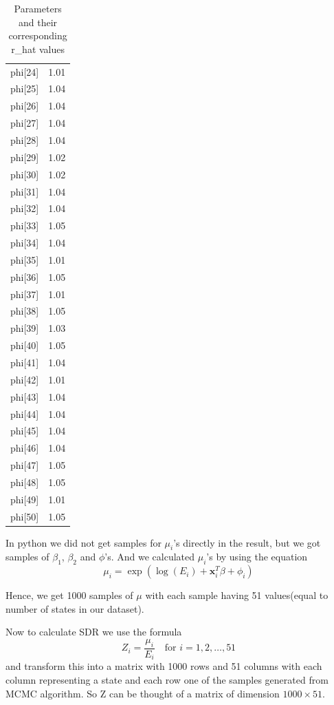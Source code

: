 \documentclass[enabledeprecatedfontcommands,parskip=half,twoside=semi,BCOR=0mm]{scrreprt}
\numberwithin{equation}{chapter}
\theoremstyle{definition}
\theoremstyle{remark}
\begin{document}
\begin{table}[h!]
\begin{adjustbox}{max width=\textwidth}
\begin{minipage}{0.48\textwidth}
\begin{tabular}{l r}
    phi[24] & 1.01 \\
    phi[25] & 1.04 \\
    phi[26] & 1.04 \\
    phi[27] & 1.04 \\
    phi[28] & 1.04 \\
    phi[29] & 1.02 \\
    phi[30] & 1.02 \\
    phi[31] & 1.04 \\
    phi[32] & 1.04 \\
    phi[33] & 1.05 \\
    phi[34] & 1.04 \\
    phi[35] & 1.01 \\
    phi[36] & 1.05 \\
    phi[37] & 1.01 \\
    phi[38] & 1.05 \\
    phi[39] & 1.03 \\
    phi[40] & 1.05 \\
    phi[41] & 1.04 \\
    phi[42] & 1.01 \\
    phi[43] & 1.04 \\
    phi[44] & 1.04 \\
    phi[45] & 1.04 \\
    phi[46] & 1.04 \\
    phi[47] & 1.05 \\
    phi[48] & 1.05 \\
    phi[49] & 1.01 \\
    phi[50] & 1.05 \\
    \end{tabular}
    \end{minipage}
    \end{adjustbox}
    \caption{Parameters and their corresponding r\_hat values}
    \label{tab:Table 1}
    \end{table}

    
    
    In python we did not get samples for \(\mu_i\)'s directly in the result, but we got samples of \(\beta_1\), \(\beta_2\) and \(\phi\)'s. And we calculated \(\mu_i\)'s by using the equation 
    \[
    \mu_i = \exp(\log(E_i) + \mathbf{x}_i^T \beta + \phi_i)
    \] 
    
    Hence, we get 1000 samples of \(\mu\) with each sample having 51 values(equal to number of states in our dataset). 
    
    Now to calculate SDR we use the formula 
    \[
    Z_i = \frac{\mu_i}{E_i} \quad \text{for } i = 1, 2, \ldots, 51
    \]
    and transform this into a matrix with 1000 rows and 51 columns with each column representing a state and each row one of the samples generated from MCMC algorithm. So Z can be thought of a matrix of dimension \(1000\times51\). 
    
\end{document}
